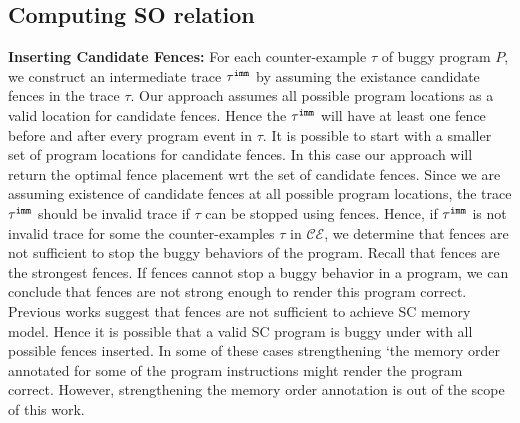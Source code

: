 

\subsection{Computing SO relation}
\noindent\textbf{Inserting Candidate Fences:}
For each counter-example $ \tau $ of buggy program $ P $, we 
construct an intermediate trace $ {\tau}^{\mathtt{imm}} $ by assuming the existance candidate fences in the trace $ \tau $.
Our approach assumes all possible program locations as a valid location 
for candidate fences. 
Hence the $ {\tau}^{\mathtt{imm}} $ will have at least one \mosc fence before and after every program event in $ \tau $.
It is possible to start with a smaller set of program locations for 
candidate fences. 
In this case our approach will return the optimal fence placement wrt the 
set of candidate fences.
Since we are assuming existence of candidate fences at all possible 
program locations, the trace $ {\tau}^{\mathtt{imm}} $ should be invalid \cc trace 
if $ \tau $ can be stopped using \mosc fences.
Hence, if $ {\tau}^{\mathtt{imm}} $ is not invalid \cc trace for some 
the counter-examples $ \tau $ in $ \mathcal{CE} $, we determine that \mosc 
fences are not sufficient to stop the buggy behaviors of the program.
Recall that \mosc fences are the strongest \cc fences. 
If \mosc fences cannot stop a buggy behavior in a program, we can conclude 
that \cc fences are not strong enough to render this program correct.
Previous works \cite{LahavVafeiadis-PLDI17,Batty-POPL12} suggest that \mosc fences are not sufficient to achieve SC memory 
model. 
Hence it is possible that a valid SC program is buggy under \cc with all 
possible \mosc fences inserted. 
In some of these cases strengthening `the memory order annotated for some 
of the program instructions might render the program correct. 
However, strengthening the memory order annotation is out of the scope of this work. 

